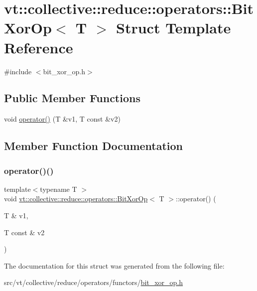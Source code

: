 \hypertarget{structvt_1_1collective_1_1reduce_1_1operators_1_1_bit_xor_op}{}\section{vt\+:\+:collective\+:\+:reduce\+:\+:operators\+:\+:Bit\+Xor\+Op$<$ T $>$ Struct Template Reference}
\label{structvt_1_1collective_1_1reduce_1_1operators_1_1_bit_xor_op}


{\ttfamily \#include $<$bit\+\_\+xor\+\_\+op.\+h$>$}

\subsection*{Public Member Functions}
\begin{DoxyCompactItemize}
\item 
void \hyperlink{structvt_1_1collective_1_1reduce_1_1operators_1_1_bit_xor_op_a55f8d04efd5ca141896d6df56684c325}{operator()} (T \&v1, T const \&v2)
\end{DoxyCompactItemize}


\subsection{Member Function Documentation}
\mbox{\label{structvt_1_1collective_1_1reduce_1_1operators_1_1_bit_xor_op_a55f8d04efd5ca141896d6df56684c325}} 
\subsubsection{\texorpdfstring{operator()()}{operator()()}}
{\footnotesize\ttfamily template$<$typename T $>$ \\
void \hyperlink{structvt_1_1collective_1_1reduce_1_1operators_1_1_bit_xor_op}{vt\+::collective\+::reduce\+::operators\+::\+Bit\+Xor\+Op}$<$ T $>$\+::operator() (\begin{DoxyParamCaption}\item[{T \&}]{v1,  }\item[{T const \&}]{v2 }\end{DoxyParamCaption})\hspace{0.3cm}{\ttfamily [inline]}}



The documentation for this struct was generated from the following file\+:\begin{DoxyCompactItemize}
\item 
src/vt/collective/reduce/operators/functors/\hyperlink{bit__xor__op_8h}{bit\+\_\+xor\+\_\+op.\+h}\end{DoxyCompactItemize}
